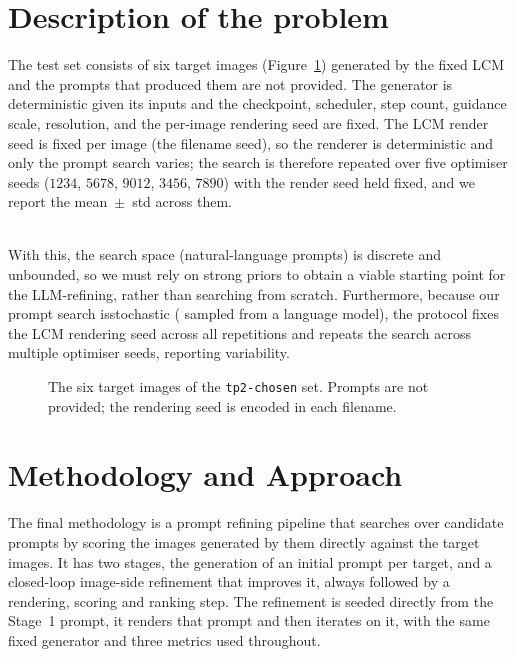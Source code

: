 \documentclass[runningheads]{llncs}
\begin{document}
\section{Description of the problem}
\noindent
The test set consists of six target images (Figure~\ref{fig:targets}) generated by the fixed LCM and the prompts that produced them are not provided. The generator is deterministic given its inputs and the checkpoint, scheduler, step count, guidance scale, resolution, and the per-image rendering seed are fixed. The LCM render seed is fixed per image (the filename seed), so the renderer is deterministic and only the prompt search varies; the search is therefore repeated over five optimiser seeds ($1234$, $5678$, $9012$, $3456$, $7890$) with the render seed held fixed, and we report the mean~$\pm$~std across them.

\noindent
\\
With this, the search space (natural-language prompts) is discrete and unbounded, so we must rely on strong priors to obtain a viable starting point for the LLM-refining, rather than searching from scratch. Furthermore, because our prompt search isstochastic ( sampled from a language model), the protocol fixes the LCM rendering seed across all repetitions and repeats the search across multiple optimiser seeds, reporting variability.

\begin{figure}[H]
    \centering
    \caption{The six target images of the \texttt{tp2-chosen} set. Prompts are not provided; the rendering seed is encoded in each filename.}
    \label{fig:targets}
\end{figure}

\section{Methodology and Approach}
The final methodology is a prompt refining pipeline that searches over candidate prompts by scoring the images generated by them directly against the target images. It has two stages, the generation of an initial prompt per target, and a closed-loop image-side refinement that improves it, always followed by a rendering, scoring and ranking step. The refinement is seeded directly from the Stage~1 prompt, it renders that prompt and then iterates on it, with the same fixed generator and three metrics used throughout.
\end{document}
